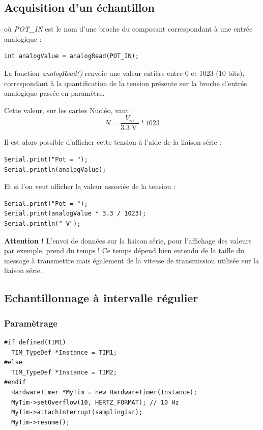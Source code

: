 \documentclass[a4paper,11pt,titlepage]{article} %
\begin{document}
\subsection{Acquisition d'un échantillon}

où \textsl{POT\_IN} est le nom d'une broche du composant correspondant à une entrée analogique :

\begin{lstlisting}
int analogValue = analogRead(POT_IN);
\end{lstlisting}

La fonction \textsl{analogRead()} renvoie une valeur entière entre 0 et 1023 (10 bits), correspondant à la quantification de la tension présente sur la broche d'entrée analogique passée en paramètre.

Cette valeur, sur les cartes Nucléo, vaut : $$N = \frac{V_{in}}{3.3\operatorname{V}} * 1023$$

Il est alors possible d'afficher cette tension à l'aide de la liaison série :

\begin{lstlisting}
Serial.print("Pot = ");
Serial.println(analogValue);
\end{lstlisting}

Et si l'on veut afficher la valeur associée de la tension :

\begin{lstlisting}
Serial.print("Pot = ");
Serial.print(analogValue * 3.3 / 1023);
Serial.println(" V");
\end{lstlisting}

\textbf{Attention !} L'envoi de données sur la liaison série, pour l'affichage des valeurs par exemple, prend du temps ! Ce temps dépend bien entendu de la taille du message à transmettre mais également de la vitesse de transmission utilisée sur la liaison série.

\subsection{Echantillonnage à intervalle régulier}


\subsubsection{Paramètrage}

\begin{lstlisting}
#if defined(TIM1)
  TIM_TypeDef *Instance = TIM1;
#else
  TIM_TypeDef *Instance = TIM2;
#endif
  HardwareTimer *MyTim = new HardwareTimer(Instance);
  MyTim->setOverflow(10, HERTZ_FORMAT); // 10 Hz
  MyTim->attachInterrupt(samplingIsr);
  MyTim->resume();
\end{lstlisting}
\end{document}
